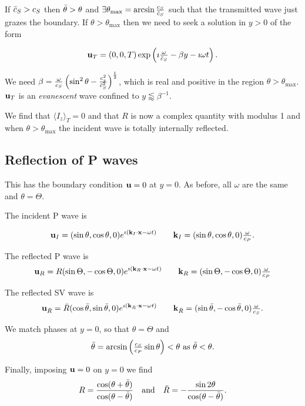 \documentclass{notes}
\newcommand{\vk}{\vect{k}}
\begin{document}
If $\Bar{c}_S > c_S$ then $\Bar{\theta} > \theta$ and $\exists
\theta_{\text{max}} = \arcsin \tfrac{c_S}{\Bar{c}_S}$ such that the
transmitted wave just grazes the boundary.  If $\theta >
\theta_{\text{max}}$ then we need to seek a solution in $y > 0$ of the
form

\[
\mathbf{u}_T = (0,0,T) \exp \left(\imath \tfrac{\omega}{\Bar{c}_S}
- \beta y - \imath \omega t \right).
\]

We need $\beta = \tfrac{\omega}{c_S} \left( \sin^2 \theta
- \tfrac{c_s^2}{\Bar{c}_S^2} \right)^{\frac{1}{2}}$, which
is real and positive in the region $\theta > \theta_{\text{max}}$.
$\mathbf{u}_T$ is an \emph{evanescent} wave confined to $y \lessapprox \beta^{-1}$.

We find that $\langle I_z \rangle_T = 0$ and that $R$ is now a complex
quantity with modulus 1 and when $\theta > \theta_{\text{max}}$ the
incident wave is totally internally reflected.

\subsection{Reflection of P waves}

\vspace{1.5in}

This has the boundary condition $\mathbf{u} = 0$ at $y = 0$.  As before, all
$\omega$ are the same and $\theta = \Theta$.

The incident P wave is

\[
\vu_I = (\sin \theta,\cos \theta,0) e^{\imath(\vk_I\cdot\vx - \omega t)}
\qquad \vk_I = (\sin \theta, \cos \theta,0) \tfrac{\omega}{c_P}.
\]

The reflected P wave is
\[
\vu_R = R (\sin \Theta, - \cos \Theta,0) e^{\imath(\vk_R\cdot\vx - \omega t)}
\qquad \vk_R = (\sin \Theta, - \cos \Theta,0) \tfrac{\omega}{c_P} 
\]

The reflected SV wave is
\[
\vu_{\Bar{R}} = \Bar{R} (\cos \Bar{\theta}, \sin \Bar{\theta},0)
e^{\imath(\vk_{\Bar{R}}\cdot\vx - \omega t)}
\qquad \vk_{\Bar{R}} = (\sin \Bar{\theta}, - \cos \Bar{\theta},0)
\tfrac{\omega}{c_S}.
\]

We match phases at $y=0$, so that $\theta = \Theta$
and
\[
\Bar{\theta} = \arcsin \left( \tfrac{c_S}{c_P} \sin \theta \right) < \theta
\text{ as } \Bar{\theta} < \theta.
\]

Finally, imposing $\mathbf{u} = 0$ on $y=0$ we find
\[
R = \frac{\cos (\theta + \Bar{\theta})}{\cos (\theta - \Bar{\theta})}
\quad \text{and} \quad
\Bar{R} = - \frac{\sin 2 \theta}{\cos (\theta - \Bar{\theta})}.
\]
\end{document}
